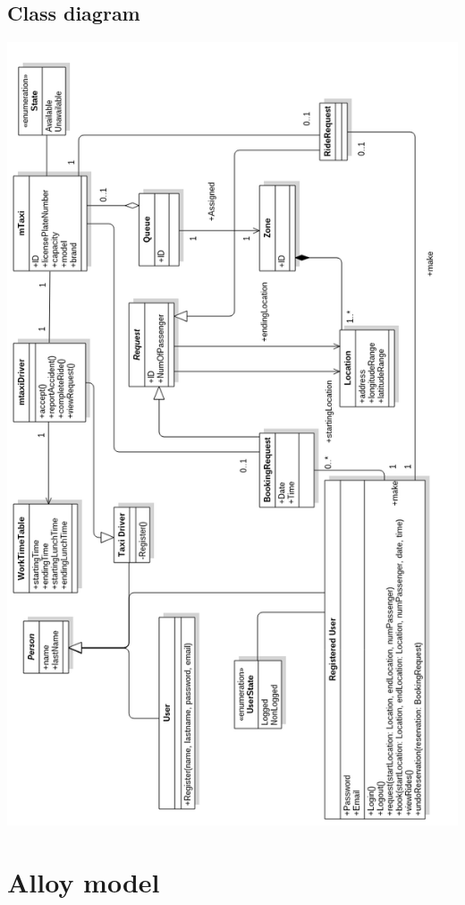 \documentclass[11pt,titlepage]{article} %
\begin{document}
	\subsection{Class diagram}
	\includegraphics[scale=0.55]{classdiagram.png}

	\section{Alloy model}
\end{document}
